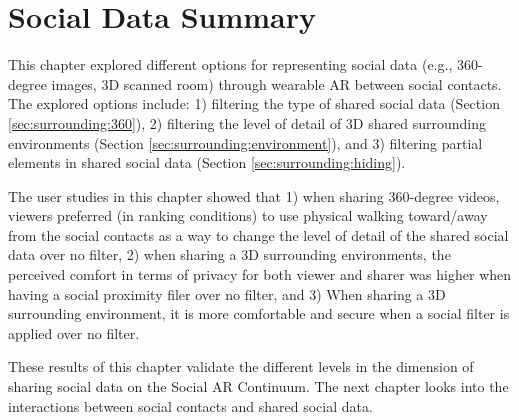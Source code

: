 \pagebreak
\section{Social Data Summary}

This chapter explored different options for representing social data (e.g., 360-degree images, 3D scanned room) through wearable AR between social contacts. The explored options include: 1) filtering the type of shared social data (Section \ref{sec:surrounding:360}), 2) filtering the level of detail of 3D shared surrounding environments (Section \ref{sec:surrounding:environment}), and 3) filtering partial elements in shared social data (Section \ref{sec:surrounding:hiding}). 

The user studies in this chapter showed that 1) when sharing 360-degree videos, viewers preferred (in ranking conditions) to use physical walking toward/away from the social contacts as a way to change the level of detail of the shared social data over no filter, 2) when sharing a 3D surrounding environments, the perceived comfort in terms of privacy for both viewer and sharer was higher when having a social proximity filer over no filter, and 3)  When sharing a 3D surrounding environment, it is more comfortable and secure when a social filter is applied over no filter.

These results of this chapter validate the different levels in the dimension of sharing social data on the Social AR Continuum. The next chapter looks into the interactions between social contacts and shared social data. 
